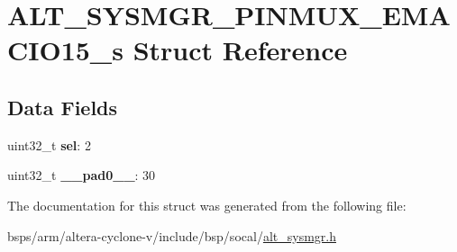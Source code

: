\hypertarget{structALT__SYSMGR__PINMUX__EMACIO15__s}{}\section{A\+L\+T\+\_\+\+S\+Y\+S\+M\+G\+R\+\_\+\+P\+I\+N\+M\+U\+X\+\_\+\+E\+M\+A\+C\+I\+O15\+\_\+s Struct Reference}
\label{structALT__SYSMGR__PINMUX__EMACIO15__s}
\subsection*{Data Fields}
\begin{DoxyCompactItemize}
\item 
\mbox{\label{structALT__SYSMGR__PINMUX__EMACIO15__s_a8f4d0e28f0b1e833198d09cb26383972}} 
uint32\+\_\+t {\bfseries sel}\+: 2
\item 
\mbox{\label{structALT__SYSMGR__PINMUX__EMACIO15__s_ab51ad8a220bddadc4af5ed156e83b80c}} 
uint32\+\_\+t {\bfseries \+\_\+\+\_\+pad0\+\_\+\+\_\+}\+: 30
\end{DoxyCompactItemize}


The documentation for this struct was generated from the following file\+:\begin{DoxyCompactItemize}
\item 
bsps/arm/altera-\/cyclone-\/v/include/bsp/socal/\mbox{\hyperlink{alt__sysmgr_8h}{alt\+\_\+sysmgr.\+h}}\end{DoxyCompactItemize}
